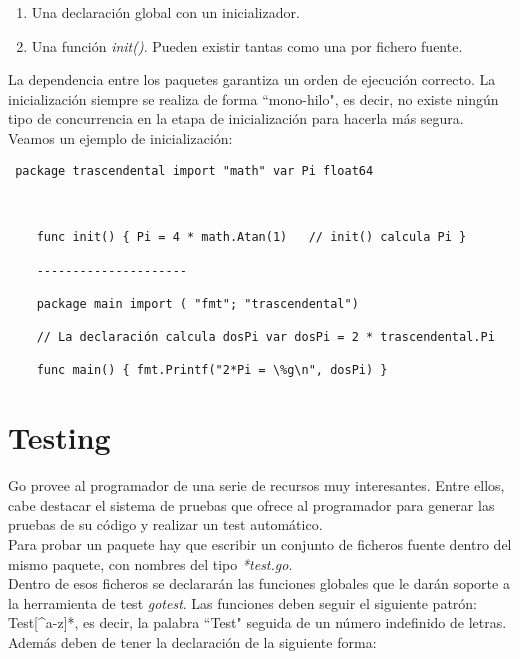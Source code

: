 \begin{enumerate} \item Una declaración global con un inicializador.  \item Una
función \textit{init()}. Pueden existir tantas como una por fichero fuente.
\end{enumerate}

La dependencia entre los paquetes garantiza un orden de ejecución correcto. La
inicialización siempre se realiza de forma ``mono-hilo", es decir, no existe
ningún tipo de concurrencia en la etapa de inicialización para hacerla más
segura. Veamos un ejemplo de inicialización:

\begin{verbatim} package trascendental import "math" var Pi float64
    
    
    
	func init() { Pi = 4 * math.Atan(1)   // init() calcula Pi }
    
	---------------------
    
	package main import ( "fmt"; "trascendental")
    
	// La declaración calcula dosPi var dosPi = 2 * trascendental.Pi
    
	func main() { fmt.Printf("2*Pi = \%g\n", dosPi) } \end{verbatim}


\section{Testing}

Go provee al programador de una serie de recursos muy interesantes. Entre ellos,
cabe destacar el sistema de pruebas que ofrece al programador para generar las
pruebas de su código y realizar un test automático.\\

Para probar un paquete hay que escribir un conjunto de ficheros fuente dentro
del mismo paquete, con nombres del tipo \textit{*\textunderscore test.go}.\\

Dentro de esos ficheros se declararán las funciones globales que le darán
soporte a la herramienta de test \textit{gotest}. Las funciones deben seguir el
siguiente patrón: Test[\textasciicircum a-z]*, es decir, la palabra ``Test"
seguida de un número indefinido de letras. Además deben de tener la declaración
de la siguiente forma:

